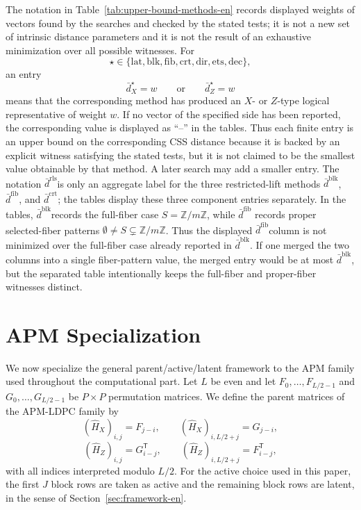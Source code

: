 \documentclass[11pt]{article}
\newcommand{\Z}{\mathbb{Z}}
\newcommand{\Hhat}{\hat{H}}
\newcommand{\dbound}[1]{\ensuremath{\bar{d}^{\mathrm{#1}}}}
\newcommand{\drls}{\dbound{rls}}
\newcommand{\dblk}{\dbound{blk}}
\newcommand{\dfib}{\dbound{fib}}
\newcommand{\dcrt}{\dbound{crt}}
\newcommand{\markededit}[1]{#1}
\theoremstyle{uprightthm}
\begin{document}
The notation in Table~\ref{tab:upper-bound-methods-en} records displayed
weights of \markededit{vectors found by the searches and checked by the stated tests}; it is not a new set of
intrinsic distance parameters and it is not the result of an exhaustive
minimization over all possible witnesses.  For
\[
\star\in\{\mathrm{lat},\mathrm{blk},\mathrm{fib},\mathrm{crt},
\mathrm{dir},\mathrm{ets},\mathrm{dec}\},
\]
an entry
\[
\bar d_X^{\star}=w
\qquad
\text{or}
\qquad
\bar d_Z^{\star}=w
\]
means that \markededit{the corresponding method has produced an $X$- or
$Z$-type logical representative of weight $w$}.  If \markededit{no vector of the specified
side has been reported}, the corresponding value is displayed as ``--'' in the
tables.  \markededit{Thus each finite entry is an upper bound on the
corresponding CSS distance because it is backed by an explicit witness satisfying
the stated tests, but it is not claimed to be the smallest value obtainable by
that method.}  A later search may add a smaller entry.
The notation \drls is only an aggregate label for the three restricted-lift
methods \dblk, \dfib, and \dcrt; the tables display these three component
entries separately.
\markededit{In the tables, \dblk records the full-fiber case \(S=\Z/m\Z\), while \dfib
records proper selected-fiber patterns \(\emptyset\neq S\subsetneq\Z/m\Z\).
Thus the displayed \dfib column is not minimized over the full-fiber case
already reported in \dblk.  If one merged the two columns into a single
fiber-pattern value, the merged entry would be at most \dblk, but the separated
table intentionally keeps the full-fiber and proper-fiber witnesses distinct.}

\section{APM Specialization}
\label{sec:apm-specialization-en}
We now specialize the general parent/active/latent framework to the APM family used throughout the computational part.
Let $L$ be even and let $F_0,\dots,F_{L/2-1}$ and $G_0,\dots,G_{L/2-1}$ be $P\times P$ permutation matrices. We define the parent matrices of the APM-LDPC family by
\[
(\Hhat_X)_{i,j}=F_{j-i},\qquad
(\Hhat_X)_{i,L/2+j}=G_{j-i},
\]
\[
(\Hhat_Z)_{i,j}=G_{i-j}^{\mathsf T},\qquad
(\Hhat_Z)_{i,L/2+j}=F_{i-j}^{\mathsf T},
\]
with all indices interpreted modulo $L/2$.
For the active choice used in this paper, the first $J$ block rows are taken as active and the remaining block rows are latent, in the sense of Section~\ref{sec:framework-en}.
\end{document}
